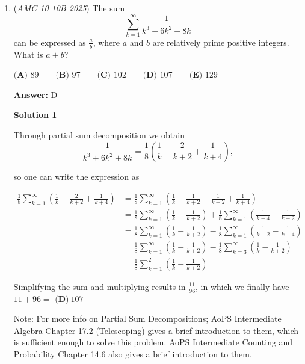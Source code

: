 \begin{enumerate}
 Therefore, the desired probability is

 
 \[\frac{540}{1680}=\frac{9}{28}.\]

 Thus,

 
 \[\boxed{\textbf{(C) }\frac{9}{28}}.\]



	\item (\textit{AMC 10 10B 2025}) The sum 
 \[\sum_{k=1}^{\infty} \frac{1}{k^3 + 6k^2 + 8k}\] can be expressed as $\frac{a}{b}$, where $a$ and $b$ are relatively prime positive integers. What is $a + b$?


 $\textbf{(A) } 89 \qquad \textbf{(B) } 97 \qquad \textbf{(C) } 102 \qquad \textbf{(D) } 107 \qquad \textbf{(E) } 129$

 \textbf{Answer: }D



\textbf{Solution 1}

Through partial sum decomposition we obtain
 \[\frac{1}{k^3 + 6k^2 + 8k} = \frac{1}{8} \left( \frac{1}{k} - \frac{2}{k+2} + \frac{1}{k+4} \right),\] 

 so one can write the expression as 

 \begin{align*}\frac{1}{8} \sum_{k=1}^\infty \left( \frac{1}{k} - \frac{2}{k+2} + \frac{1}{k+4} \right)&=\frac{1}{8} \sum_{k=1}^\infty \left( \frac{1}{k} - \frac{1}{k+2}-\frac{1}{k+2} + \frac{1}{k+4} \right)\\&=\frac{1}{8} \sum_{k=1}^\infty \left( \frac{1}{k} - \frac{1}{k+2} \right)+ \frac{1}{8} \sum_{k=1}^\infty \left( \frac{1}{k+4} - \frac{1}{k+2} \right)\\&=\frac{1}{8} \sum_{k=1}^{\infty} \left( \frac{1}{k} - \frac{1}{k+2} \right) - \frac{1}{8} \sum_{k=1}^{\infty} \left( \frac{1}{k+2} - \frac{1}{k+4} \right)\\&=\frac{1}{8} \sum_{k=1}^{\infty} \left( \frac{1}{k} - \frac{1}{k+2} \right) - \frac{1}{8} \sum_{k=3}^{\infty} \left( \frac{1}{k} - \frac{1}{k+2} \right)\\&=\frac{1}{8} \sum_{k=1}^{2} \left( \frac{1}{k} - \frac{1}{k+2} \right)\end{align*}


 Simplifying the sum and multiplying results in $\frac{11}{96}$, in which we finally have $11 + 96 =$ $\boxed{\textbf{(D)}~107}$

 Note: For more info on Partial Sum Decompositions; AoPS Intermediate Algebra Chapter 17.2 (Telescoping) gives a brief introduction to them, which is sufficient enough to solve this problem. AoPS Intermediate Counting and Probability Chapter 14.6 also gives a brief introduction to them.


\end{enumerate}
